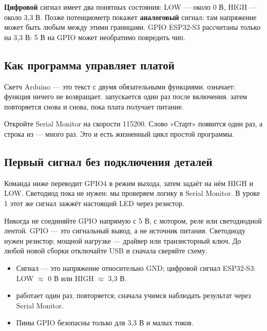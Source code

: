 \textbf{Цифровой} сигнал имеет два понятных состояния: LOW --- около 0 В, HIGH --- около 3,3 В.
Позже потенциометр покажет \textbf{аналоговый} сигнал: там напряжение может быть любым между этими
границами. GPIO ESP32-S3 рассчитаны только на 3,3 В: 5 В на GPIO может необратимо повредить чип.

\subsection*{Как программа управляет платой}

Скетч Arduino --- это текст с двумя обязательными функциями.  означает: функция ничего
не возвращает.  запускается один раз после включения.  затем повторяется
снова и снова, пока плата получает питание.


Откройте Serial Monitor на скорости 115200. Слово «Старт» появится один раз, а строка из 
--- много раз. Это и есть жизненный цикл простой программы.

\subsection*{Первый сигнал без подключения деталей}

Команда ниже переводит GPIO4 в режим выхода, затем задаёт на нём HIGH и LOW. Светодиод пока не нужен:
мы проверяем логику в Serial Monitor. В уроке 1 этот же сигнал зажжёт настоящий LED через резистор.


\begin{caution}
Никогда не соединяйте GPIO напрямую с 5 В, с мотором, реле или светодиодной лентой. GPIO --- это
сигнальный вывод, а не источник питания. Светодиоду нужен резистор; мощной нагрузке --- драйвер или
транзисторный ключ. До любой новой сборки отключайте USB и сначала сверяйте схему.
\end{caution}

\begin{summary}
\begin{itemize}[leftmargin=*]
  \item Сигнал --- это напряжение относительно GND; цифровой сигнал ESP32-S3: LOW \(\approx\) 0 В или HIGH \(\approx\) 3,3 В.
  \item {} работает один раз,  повторяется; сначала учимся наблюдать результат через Serial Monitor.
  \item Пины GPIO безопасны только для 3,3 В и малых токов.
\end{itemize}
\end{summary}

